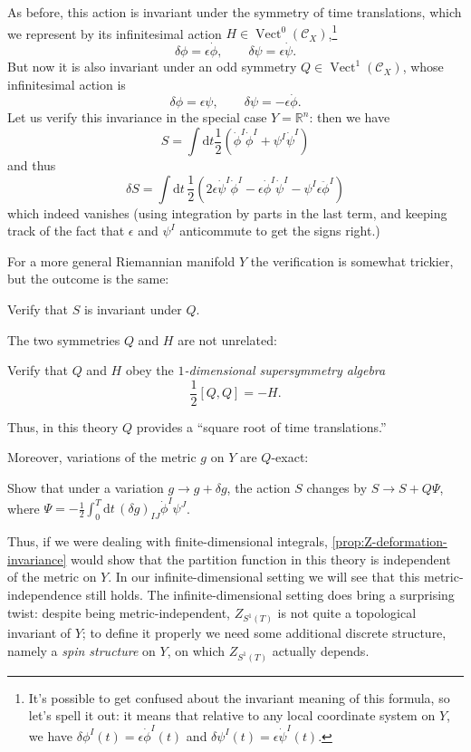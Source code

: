 \documentclass[12pt,letterpaper,reqno]{article}
\numberwithin{equation}{section}
\newcommand{\cC}{\ensuremath{\mathcal C}}
\newcommand{\R}{\ensuremath{\mathbb R}}
\newcommand{\half}{\ensuremath{\frac{1}{2}}}
\newcommand{\de}{\mathrm{d}}
\newcommand{\eps}{\epsilon}
\newcommand{\ti}[1]{\textit{#1}}
\DeclareMathOperator{\Vect}{Vect}
\newcommand{\fixme}[1]{{\color{orange}{[#1]}}}
\begin{document}
As before, this action is invariant under the symmetry of time translations,
which we represent by its infinitesimal action $H \in \Vect^0(\cC_X)$,\footnote{It's possible to 
get confused about the invariant meaning of this formula, so let's spell it out:
it means that relative to any local coordinate system on $Y$, we have
$\delta \phi^I(t) = \eps \dot\phi^I(t)$ and $\delta \psi^I(t) = \eps \dot \psi^I(t)$.}
\begin{equation}
  \delta \phi = \eps \dot\phi, \qquad \delta \psi = \eps \dot\psi.
\end{equation}
But now it is also invariant under an odd symmetry $Q \in \Vect^1(\cC_X)$,
whose infinitesimal action is
\begin{equation}
  \delta \phi = \eps \psi, \qquad \delta \psi = - \eps \dot\phi.
\end{equation}
Let us verify this invariance in the special case $Y = \R^n$:
then we have
\begin{equation}
  S = \int \de t \half (\dot\phi^I \dot\phi^I + \psi^I \dot \psi^I)
\end{equation}
and thus
\begin{equation}
  \delta S = \int \de t \, \half (2 \eps \dot\psi^I \dot\phi^I - \eps \dot\phi^I \dot\psi^I - \psi^I \eps \ddot \phi^I)
\end{equation}
which indeed vanishes (using integration by parts in the last term,
and keeping track of the fact that $\eps$ and $\psi^I$ anticommute
to get the signs right.)

For a more general Riemannian manifold $Y$ the verification is
somewhat trickier, but the outcome is the same:
\begin{exercise}
Verify that $S$ is invariant under $Q$.
\end{exercise}

The two symmetries $Q$ and $H$ are not unrelated:
\begin{exercise}
Verify that $Q$ and $H$ obey the \ti{$1$-dimensional supersymmetry algebra}
\begin{equation}
  \half [Q,Q] = -H.
\end{equation}
\end{exercise}
Thus, in this theory $Q$ provides a ``square root of time translations.''

Moreover, variations of the metric $g$ on $Y$ are $Q$-exact:
\begin{exercise}
Show that under a variation $g \to g + \delta g$,
the action $S$ changes by $S \to S + Q \Psi$, where 
$\Psi = -\half \int_0^T \de t \, (\delta g)_{IJ} \dot \phi^I \psi^J$. \fixme{check}
\end{exercise}
Thus, if we were dealing with finite-dimensional integrals, 
\autoref{prop:Z-deformation-invariance} would show 
that the partition function in this theory
is independent of the metric on $Y$. In our infinite-dimensional
setting we will see that this metric-independence still holds.
The infinite-dimensional setting does bring a surprising twist:
despite being metric-independent, 
$Z_{S^1(T)}$ is not quite a topological invariant of $Y$; to define 
it properly we need some additional discrete structure,
namely a \ti{spin structure} on $Y$, on which $Z_{S^1(T)}$
actually depends.
\end{document}
